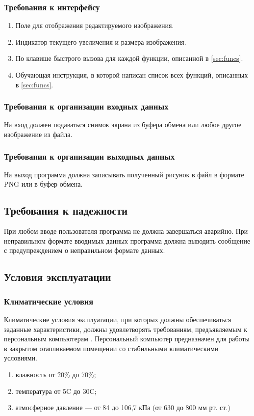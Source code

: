 \documentclass[a4paper,12pt,reqno]{article}
\begin{document}
  \subsubsection{Требования к интерфейсу}
  \begin{enumerate}
    \item Поле для отображения редактируемого изображения.
    \item Индикатор текущего увеличения и размера изображения.
    \item По клавише быстрого вызова для каждой функции, описанной в \autoref{sec:funcs}.
    \item Обучающая инструкция, в которой написан список всех функций, описанных в \autoref{sec:funcs}.
  \end{enumerate}

  \subsubsection{Требования к организации входных данных}
  На вход должен подаваться снимок экрана из буфера обмена или любое другое изображение из файла.
  \subsubsection{Требования к организации выходных данных}
  На выход программа должна записывать полученный рисунок в файл в формате PNG или в буфер обмена.
  \subsection{Требования к надежности}
  При любом вводе пользователя программа не должна завершаться аварийно.
  При неправильном формате вводимых данных программа должна выводить сообщение с предупреждением о неправильном формате данных.
  \newpage

  \subsection{Условия эксплуатации}
  \subsubsection{Климатические условия}
  Климатические условия эксплуатации, при которых должны обеспечиваться заданные характеристики, должны удовлетворять требованиям, предъявляемым к персональным компьютерам \cite{gostclimate}.
  Персональный компьютер предназначен для работы в закрытом отапливаемом помещении со стабильными климатическими условиями.
  \begin{enumerate}
    \item влажность от 20\% до 70\%;
    \item температура от 5\degree C до 30\degree C;
    \item атмосферное давление --- от 84 до 106,7 кПа (от 630 до 800 мм рт. ст.)
  \end{enumerate}
\end{document}
